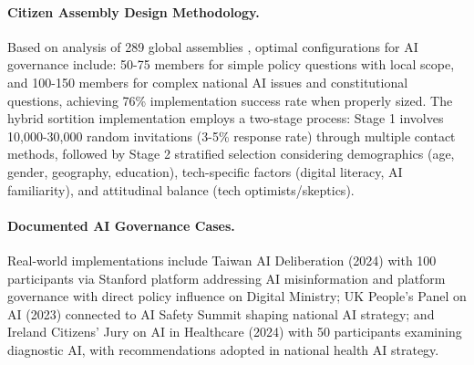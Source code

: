 \documentclass[manuscript,screen,9pt]{acmart}
\begin{document}
\paragraph{Citizen Assembly Design Methodology.} Based on analysis of 289 global assemblies \cite{OECD2020CitizenParticipation}, optimal configurations for AI governance include: 50-75 members for simple policy questions with local scope, and 100-150 members for complex national AI issues and constitutional questions, achieving 76\% implementation success rate when properly sized. The hybrid sortition implementation employs a two-stage process: Stage 1 involves 10,000-30,000 random invitations (3-5\% response rate) through multiple contact methods, followed by Stage 2 stratified selection considering demographics (age, gender, geography, education), tech-specific factors (digital literacy, AI familiarity), and attitudinal balance (tech optimists/skeptics).

\paragraph{Documented AI Governance Cases.} Real-world implementations include Taiwan AI Deliberation (2024) with 100 participants via Stanford platform addressing AI misinformation and platform governance with direct policy influence on Digital Ministry; UK People's Panel on AI (2023) connected to AI Safety Summit shaping national AI strategy; and Ireland Citizens' Jury on AI in Healthcare (2024) with 50 participants examining diagnostic AI, with recommendations adopted in national health AI strategy.
\end{document}
